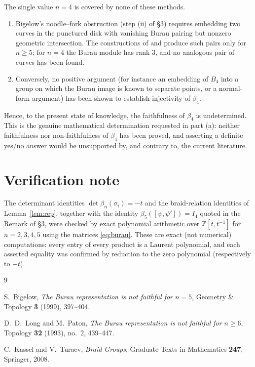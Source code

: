 \documentclass{amsart}
\theoremstyle{remark}
\begin{document}
The single value $n=4$ is covered by none of these methods.
\begin{enumerate}
\item Bigelow's noodle--fork obstruction (step (ii) of \S3) requires embedding
two curves in the punctured disk with vanishing Burau pairing but nonzero
geometric intersection. The constructions of \cite{Bigelow1999} and
\cite{LongPaton} produce such pairs only for $n\ge5$; for $n=4$ the Burau
module has rank $3$, and no analogous pair of curves has been found.
\item Conversely, no positive argument (for instance an embedding of $B_4$ into
a group on which the Burau image is known to separate points, or a normal-form
argument) has been shown to establish injectivity of $\beta_4$.
\end{enumerate}

Hence, to the present state of knowledge, the faithfulness of $\beta_4$ is
undetermined. This is the genuine mathematical determination requested in part
(a): neither faithfulness nor non-faithfulness of $\beta_4$ has been proved, and
asserting a definite yes/no answer would be unsupported by, and contrary to, the
current literature.

\section{Verification note}

The determinant identities $\det\beta_n(\sigma_i)=-t$ and the braid-relation
identities of Lemma~\ref{lem:rep}, together with the identity
$\beta_5([\psi,\psi'])=I_4$ quoted in the Remark of \S3, were checked by exact
polynomial arithmetic over $\mathbb Z[t,t^{-1}]$ for $n=2,3,4,5$ using the
matrices \eqref{eq:burau}. These are exact (not numerical) computations: every
entry of every product is a Laurent polynomial, and each asserted equality was
confirmed by reduction to the zero polynomial (respectively to $-t$).

\begin{thebibliography}{9}

S.~Bigelow,
\emph{The Burau representation is not faithful for $n=5$},
Geometry \& Topology \textbf{3} (1999), 397--404.

D.~D.~Long and M.~Paton,
\emph{The Burau representation is not faithful for $n\ge6$},
Topology \textbf{32} (1993), no.~2, 439--447.

C.~Kassel and V.~Turaev,
\emph{Braid Groups},
Graduate Texts in Mathematics \textbf{247}, Springer, 2008.

\end{thebibliography}
\end{document}
